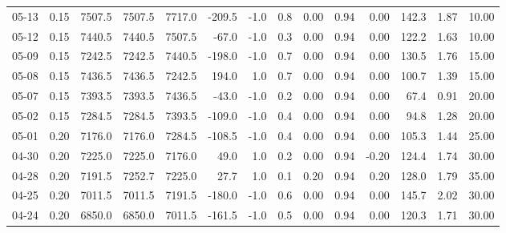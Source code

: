 \begin{threeparttable}
{\begin{tabular}{lrrrrrrrrrrrrr}
  05-13 &     0.15 & 7507.5 & 7507.5 & 7717.0 &     -209.5 &                     -1.0 &                 0.8 &       0.00 &      0.94 &           0.00 &            142.3 &            1.87 &                  10.00 \\
  05-12 &     0.15 & 7440.5 & 7440.5 & 7507.5 &      -67.0 &                     -1.0 &                 0.3 &       0.00 &      0.94 &           0.00 &            122.2 &            1.63 &                  10.00 \\
  05-09 &     0.15 & 7242.5 & 7242.5 & 7440.5 &     -198.0 &                     -1.0 &                 0.7 &       0.00 &      0.94 &           0.00 &            130.5 &            1.76 &                  15.00 \\
  05-08 &     0.15 & 7436.5 & 7436.5 & 7242.5 &      194.0 &                      1.0 &                 0.7 &       0.00 &      0.94 &           0.00 &            100.7 &            1.39 &                  15.00 \\
  05-07 &     0.15 & 7393.5 & 7393.5 & 7436.5 &      -43.0 &                     -1.0 &                 0.2 &       0.00 &      0.94 &           0.00 &             67.4 &            0.91 &                  20.00 \\
  05-02 &     0.15 & 7284.5 & 7284.5 & 7393.5 &     -109.0 &                     -1.0 &                 0.4 &       0.00 &      0.94 &           0.00 &             94.8 &            1.28 &                  20.00 \\
  05-01 &     0.20 & 7176.0 & 7176.0 & 7284.5 &     -108.5 &                     -1.0 &                 0.4 &       0.00 &      0.94 &           0.00 &            105.3 &            1.44 &                  25.00 \\
  04-30 &     0.20 & 7225.0 & 7225.0 & 7176.0 &       49.0 &                      1.0 &                 0.2 &       0.00 &      0.94 &          -0.20 &            124.4 &            1.74 &                  30.00 \\
  04-28 &     0.20 & 7191.5 & 7252.7 & 7225.0 &       27.7 &                      1.0 &                 0.1 &       0.20 &      0.94 &           0.20 &            128.0 &            1.79 &                  35.00 \\
  04-25 &     0.20 & 7011.5 & 7011.5 & 7191.5 &     -180.0 &                     -1.0 &                 0.6 &       0.00 &      0.94 &           0.00 &            145.7 &            2.02 &                  30.00 \\
  04-24 &     0.20 & 6850.0 & 6850.0 & 7011.5 &     -161.5 &                     -1.0 &                 0.5 &       0.00 &      0.94 &           0.00 &            120.3 &            1.71 &                  30.00 \\

\end{tabular}}
\end{threeparttable}
